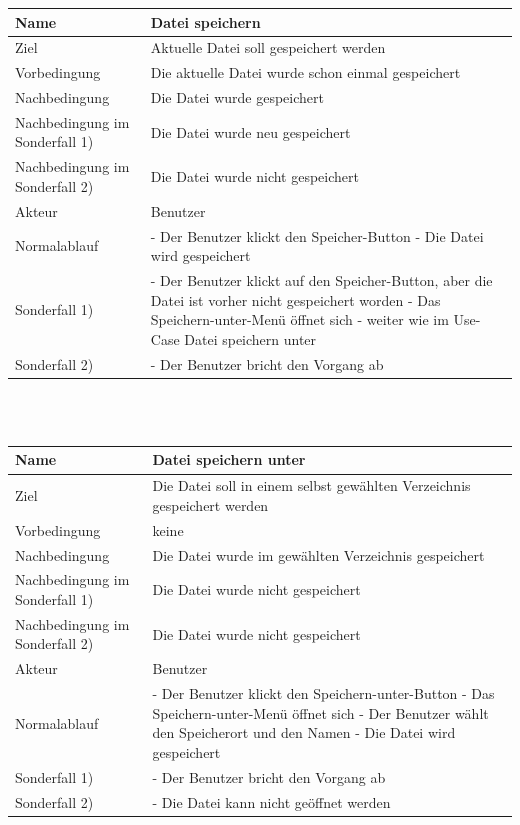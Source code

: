\documentclass[a4paper,10pt]{scrartcl}
\begin{document}
\begin{tabular}{|p{5cm}|p{10cm}|}
\hline Name & \textbf{Datei speichern} \\ 
\hline Ziel & Aktuelle Datei soll gespeichert werden \\ 
\hline Vorbedingung & Die aktuelle Datei wurde schon einmal gespeichert \\ 
\hline Nachbedingung & Die Datei wurde gespeichert \\ 
\hline Nachbedingung im Sonderfall 1) & Die Datei wurde neu gespeichert \\ 
\hline Nachbedingung im Sonderfall 2) & Die Datei wurde nicht gespeichert\\
\hline Akteur & Benutzer \\ 
\hline Normalablauf & - Der Benutzer klickt den Speicher-Button 
\newline
- Die Datei wird gespeichert
\\
\hline Sonderfall 1) & - Der Benutzer klickt auf den Speicher-Button, aber die Datei ist vorher nicht gespeichert worden
\newline
- Das Speichern-unter-Menü öffnet sich
\newline
- weiter wie im Use-Case Datei speichern unter
 \\ 
 \hline Sonderfall 2) & - Der Benutzer bricht den Vorgang ab \\
\hline 
\end{tabular} 
\\
\\
\begin{tabular}{|p{5cm}|p{10cm}|}
\hline Name & \textbf{Datei speichern unter} \\ 
\hline Ziel & Die Datei soll in einem selbst gewählten Verzeichnis gespeichert werden \\ 
\hline Vorbedingung & keine \\ 
\hline Nachbedingung & Die Datei wurde im gewählten Verzeichnis gespeichert\\ 
\hline Nachbedingung im Sonderfall 1)& Die Datei wurde nicht gespeichert\\ 
\hline Nachbedingung im Sonderfall 2)& Die Datei wurde nicht gespeichert\\
\hline Akteur & Benutzer \\ 
\hline Normalablauf & - Der Benutzer klickt den Speichern-unter-Button
\newline 
- Das Speichern-unter-Menü öffnet sich
\newline
- Der Benutzer wählt den Speicherort und den Namen
\newline
- Die Datei wird gespeichert
\\ 
\hline Sonderfall 1)& - Der Benutzer bricht den Vorgang ab \\ 
\hline Sonderfall 2)& - Die Datei kann nicht geöffnet werden\\
\hline 
\end{tabular} 
\end{document}
